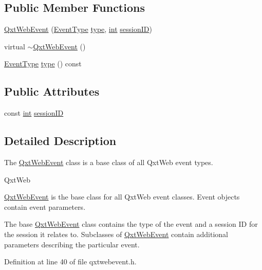 \subsection*{Public Member Functions}
\begin{DoxyCompactItemize}
\item 
\hyperlink{class_qxt_web_event_af33ce87a5bd640512b333bcd6b5935c4}{Qxt\-Web\-Event} (\hyperlink{class_qxt_web_event_abb938625cf49e454f9840a40f3fc4a3c}{Event\-Type} \hyperlink{glext_8h_a7d05960f4f1c1b11f3177dc963a45d86}{type}, \hyperlink{ioapi_8h_a787fa3cf048117ba7123753c1e74fcd6}{int} \hyperlink{class_qxt_web_event_a3fdb1d80c46e535c2c79a06269a5d307}{session\-I\-D})
\item 
virtual \hyperlink{class_qxt_web_event_a8f1975abba44ce2dc536748e5a69ae49}{$\sim$\-Qxt\-Web\-Event} ()
\item 
\hyperlink{class_qxt_web_event_abb938625cf49e454f9840a40f3fc4a3c}{Event\-Type} \hyperlink{class_qxt_web_event_a354ff1e6b3262f438f13f6f90d86edb0}{type} () const 
\end{DoxyCompactItemize}
\subsection*{Public Attributes}
\begin{DoxyCompactItemize}
\item 
const \hyperlink{ioapi_8h_a787fa3cf048117ba7123753c1e74fcd6}{int} \hyperlink{class_qxt_web_event_a3fdb1d80c46e535c2c79a06269a5d307}{session\-I\-D}
\end{DoxyCompactItemize}


\subsection{Detailed Description}
The \hyperlink{class_qxt_web_event}{Qxt\-Web\-Event} class is a base class of all Qxt\-Web event types. 

Qxt\-Web

\hyperlink{class_qxt_web_event}{Qxt\-Web\-Event} is the base class for all Qxt\-Web event classes. Event objects contain event parameters.

The base \hyperlink{class_qxt_web_event}{Qxt\-Web\-Event} class contains the type of the event and a session I\-D for the session it relates to. Subclasses of \hyperlink{class_qxt_web_event}{Qxt\-Web\-Event} contain additional parameters describing the particular event. 

Definition at line 40 of file qxtwebevent.\-h.



